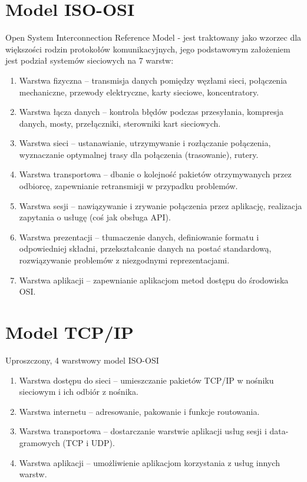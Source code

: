 \section{Model ISO-OSI}
Open System Interconnection Reference Model - jest traktowany jako wzorzec dla większości rodzin protokołów komunikacyjnych, jego podstawowym założeniem jest podział systemów sieciowych na 7 warstw:
\begin{enumerate}
	\item Warstwa fizyczna -- transmisja danych pomiędzy węzłami sieci, połączenia mechaniczne, przewody elektryczne, karty sieciowe, koncentratory.
	\item Warstwa łącza danych -- kontrola błędów podczas przesyłania, kompresja danych, mosty, przełączniki, sterowniki kart sieciowych.
	\item Warstwa sieci -- ustanawianie, utrzymywanie i rozłączanie połączenia, wyznaczanie optymalnej trasy dla połączenia (trasowanie), rutery.
	\item Warstwa transportowa -- dbanie o kolejność pakietów otrzymywanych przez odbiorcę, zapewnianie retransmisji w przypadku problemów.
	\item Warstwa sesji -- nawiązywanie i zrywanie połączenia przez aplikację, realizacja zapytania o usługę (coś jak obsługa API).
	\item Warstwa prezentacji -- tłumaczenie danych, definiowanie formatu i odpowiedniej składni, przekształcanie danych na postać standardową, rozwiązywanie problemów z niezgodnymi reprezentacjami.
	\item Warstwa aplikacji -- zapewnianie aplikacjom metod dostępu do środowiska OSI.
\end{enumerate}

\section{Model TCP/IP}
Uproszczony, 4 warstwowy model ISO-OSI
\begin{enumerate}
	\item Warstwa dostępu do sieci -- umieszczanie pakietów TCP/IP w nośniku sieciowym i ich odbiór z nośnika.
	\item Warstwa internetu -- adresowanie, pakowanie i funkcje routowania.
	\item Warstwa transportowa -- dostarczanie warstwie aplikacji usług sesji i data-gramowych (TCP i UDP).
	\item Warstwa aplikacji -- umożliwienie aplikacjom korzystania z usług innych warstw.
\end{enumerate}

